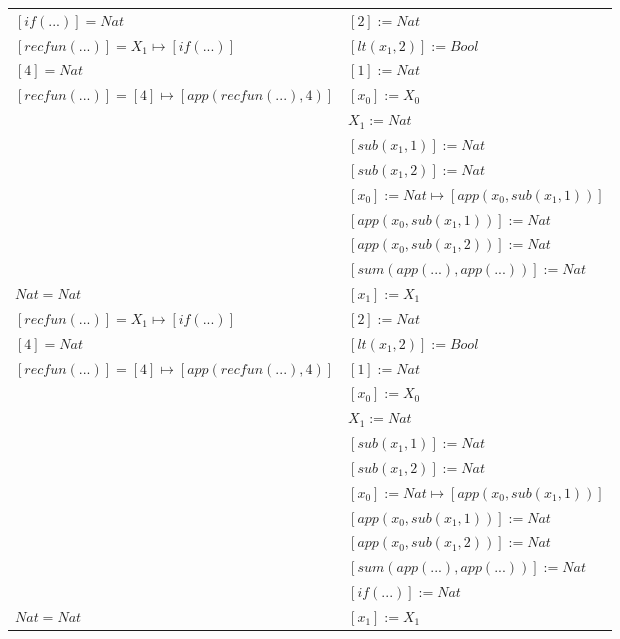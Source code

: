 \begin{exercise}
\begin{description}
\begin{center}
\begin{longtable}{ | l | l | }
                        $[if(...)] = Nat $ & $[2] := Nat$ \\
                        $[recfun(...)] = X_1 \mapsto [if(...)]$ & $[lt(x_1 , 2)] := Bool$ \\
                        $[4] = Nat$ & $[1] := Nat$ \\
                        $[recfun(...)] = [4] \mapsto [app(recfun(...), 4)]$ & $[x_0] := X_0$ \\
                        & $X_1 := Nat$ \\
                        & $[sub(x_1,1)] := Nat$ \\
                        & $[sub(x_1,2)] := Nat$ \\
                        & $[x_0] := Nat \mapsto [app(x_0, sub(x_1,1))]$ \\
                        & $[app(x_0, sub(x_1,1))] := Nat$ \\
                        & $[app(x_0, sub(x_1,2))] := Nat$ \\
                        & $[sum(app(...), app(...))] := Nat $ \\
                    \hline
                        $Nat = Nat $ & $[x_1] := X_1$ \\
                        $[recfun(...)] = X_1 \mapsto [if(...)]$ & $[2] := Nat$ \\
                        $[4] = Nat$ & $[lt(x_1 , 2)] := Bool$ \\
                        $[recfun(...)] = [4] \mapsto [app(recfun(...), 4)]$ & $[1] := Nat$\\
                        & $[x_0] := X_0$ \\
                        & $X_1 := Nat$ \\
                        & $[sub(x_1,1)] := Nat$ \\
                        & $[sub(x_1,2)] := Nat$ \\
                        & $[x_0] := Nat \mapsto [app(x_0, sub(x_1,1))]$ \\
                        & $[app(x_0, sub(x_1,1))] := Nat$ \\
                        & $[app(x_0, sub(x_1,2))] := Nat$ \\
                        & $[sum(app(...), app(...))] := Nat$ \\
                        & $[if(...)] := Nat $ \\
                    \hline
                        $Nat = Nat $ & $[x_1] := X_1$ \\

\end{longtable}
\end{center}
\end{description}
\end{exercise}
